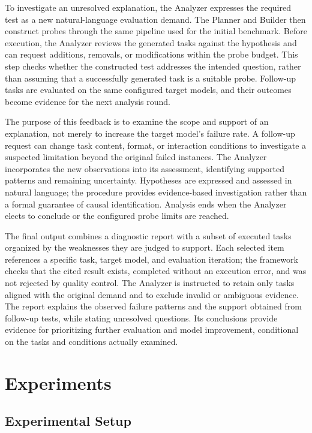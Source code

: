 \documentclass{article} %
\begin{document}
To investigate an unresolved explanation, the Analyzer expresses the required test as a new natural-language evaluation demand. The Planner and Builder then construct probes through the same pipeline used for the initial benchmark. Before execution, the Analyzer reviews the generated tasks against the hypothesis and can request additions, removals, or modifications within the probe budget. This step checks whether the constructed test addresses the intended question, rather than assuming that a successfully generated task is a suitable probe. Follow-up tasks are evaluated on the same configured target models, and their outcomes become evidence for the next analysis round.

The purpose of this feedback is to examine the scope and support of an explanation, not merely to increase the target model's failure rate. A follow-up request can change task content, format, or interaction conditions to investigate a suspected limitation beyond the original failed instances. The Analyzer incorporates the new observations into its assessment, identifying supported patterns and remaining uncertainty. Hypotheses are expressed and assessed in natural language; the procedure provides evidence-based investigation rather than a formal guarantee of causal identification. Analysis ends when the Analyzer elects to conclude or the configured probe limits are reached.

The final output combines a diagnostic report with a subset of executed tasks organized by the weaknesses they are judged to support. Each selected item references a specific task, target model, and evaluation iteration; the framework checks that the cited result exists, completed without an execution error, and was not rejected by quality control. The Analyzer is instructed to retain only tasks aligned with the original demand and to exclude invalid or ambiguous evidence. The report explains the observed failure patterns and the support obtained from follow-up tests, while stating unresolved questions. Its conclusions provide evidence for prioritizing further evaluation and model improvement, conditional on the tasks and conditions actually examined.

	\section{Experiments}
	\label{sec:exp}
	
	\subsection{Experimental Setup}
	\label{sec:settings}
	
\end{document}
